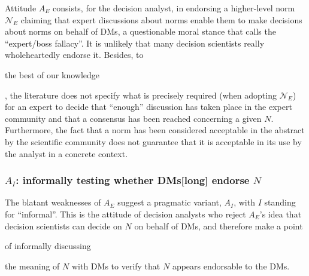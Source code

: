\documentclass[preprint, french, english, 11pt, authoryear]{elsarticle}%
\newcommand{\protectforpdf}[1]{\texorpdfstring{\ensuremath{#1}}{#1}}
\newcommand{\acp}[1]{#1s}
\newcommand{\aclp}[1]{#1s[long]}
\begin{document}
Attitude $A_E$ consists, for the decision analyst, in endorsing a higher-level norm $\mathscr{N}_E$ claiming that expert discussions about norms enable them to make decisions about norms on behalf of \acp{DM}, a questionable moral stance that \citet{estlund_democratic_2009} calls the ``expert/boss fallacy''. 
It is unlikely that many decision scientists really wholeheartedly endorse it. 
Besides, to \begin{changebar}the best of our knowledge\end{changebar}, the literature does not specify what is precisely required (when adopting  $\mathscr{N}_E$) for an expert to decide that “enough” discussion has taken place in the expert community and that a consensus has been reached concerning a given $N$. 
Furthermore, the fact that a norm has been considered acceptable in the abstract by the scientific community does not guarantee that it is acceptable in its use by the analyst in a concrete context.

\subsubsection{\texorpdfstring{$A_I$}{AI}: informally testing whether \aclp{DM} endorse \protectforpdf{N}}
The blatant weaknesses of $A_E$ suggest a pragmatic variant, $A_I$, with $I$ standing for “informal”. 
This is the attitude of decision analysts who reject $A_E$'s idea that decision scientists can decide on $N$ on behalf of \acp{DM}, and therefore make a point \begin{changebar}of informally discussing\end{changebar} the meaning of $N$ with \acp{DM} to verify that %
$N$ appears endorsable to the \acp{DM}.%
\end{document}
